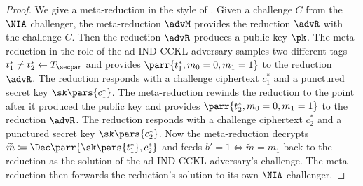 \begin{proof}
    We give a meta-reduction in the style of \cite{EC:Coron02}.
    Given a challenge \(C\) from the \(\NIA\) challenger,
    the meta-reduction \(\advM\) provides the reduction \(\advR\) with the challenge \(C\).
    Then the reduction \(\advR\) produces a public key \(\pk\).
    The meta-reduction in the role of the ad-IND-CCKL adversary samples two different tags \(t^*_1 \neq t^*_2 \gets T_\secpar\) and provides \(\parr{t^*_1,m_0=0,m_1=1}\) to the reduction \(\advR\).
    The reduction responds with a challenge ciphertext \(c^*_1\) and a punctured secret key \(\sk\pars{c^*_1}\).
    The meta-reduction rewinds the reduction to the point after it produced the public key and provides \(\parr{t^*_2,m_0=0,m_1=1}\) to the reduction \(\advR\).
    The reduction responds with a challenge ciphertext \(c^*_2\) and a punctured secret key \(\sk\pars{c^*_2}\).
    Now the meta-reduction decrypts \(\widetilde{m} \coloneqq \Dec\parr{\sk\pars{t^*_1},c^*_2}\) and feeds \(b' = 1 \iff \widetilde{m} = m_1\) back to the reduction as the solution of the ad-IND-CCKL adversary's challenge.
    The meta-reduction then forwards the reduction's solution to its own \(\NIA\) challenger.
\end{proof}

